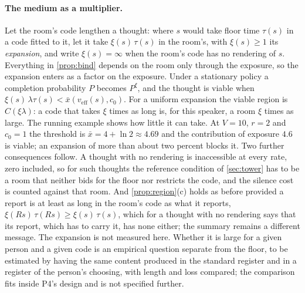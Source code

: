 \paragraph{The medium as a multiplier.} Let the room's code lengthen a thought: where $s$ would take floor time $\tau(s)$ in a code fitted to it, let it take $\xi(s)\,\tau(s)$ in the room's, with $\xi(s) \ge 1$ its \emph{expansion}, and write $\xi(s) = \infty$ when the room's code has no rendering of $s$. Everything in \autoref{prop:bind} depends on the room only through the exposure, so the expansion enters as a factor on the exposure. Under a stationary policy a completion probability $P$ becomes $P^{\xi}$, and the thought is viable when $\xi(s)\,\lambda\tau(s) < \bar{x}(v_{\mathrm{eff}}(s), c_0)$. For a uniform expansion the viable region is $C(\xi\lambda)$: a code that takes $\xi$ times as long is, for this speaker, a room $\xi$ times as large. The running example shows how little it can take. At $V = 10$, $r = 2$ and $c_0 = 1$ the threshold is $\bar{x} = 4 + \ln 2 \approx 4.69$ and the contribution of exposure $4.6$ is viable; an expansion of more than about two percent blocks it. Two further consequences follow. A thought with no rendering is inaccessible at every rate, zero included, so for such thoughts the reference condition of \autoref{sec:tower} has to be a room that neither bids for the floor nor restricts the code, and the silence cost is counted against that room. And \autoref{prop:region}(c) holds as before provided a report is at least as long in the room's code as what it reports, $\xi(Rs)\,\tau(Rs) \ge \xi(s)\,\tau(s)$, which for a thought with no rendering says that its report, which has to carry it, has none either; the summary remains a different message. The expansion is not measured here. Whether it is large for a given person and a given code is an empirical question separate from the floor, to be estimated by having the same content produced in the standard register and in a register of the person's choosing, with length and loss compared; the comparison fits inside P4's design and is not specified further.
